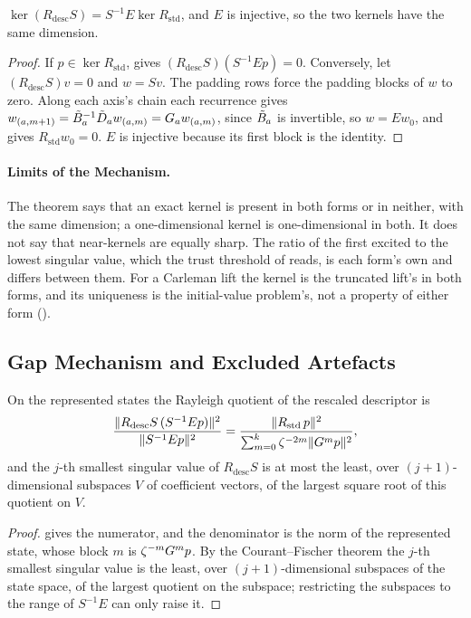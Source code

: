 \begin{theorem}
\label{thm:kernel-equivalence-general}
$\ker(R_{\mathrm{desc}}S)=S^{-1}E\ker R_{\mathrm{std}}$, and $E$ is injective, so the two kernels have the same dimension.
\end{theorem}
\begin{proof}
If $p\in\ker R_{\mathrm{std}}$,  gives $(R_{\mathrm{desc}}S)(S^{-1}Ep)=0$. Conversely, let $(R_{\mathrm{desc}}S)v=0$ and $w=Sv$. The padding rows force the padding blocks of $w$ to zero. Along each axis's chain each recurrence gives $w_{(a,m+1)}=\tilde{B}_a^{-1}\tilde{D}_aw_{(a,m)}=G_aw_{(a,m)}$, since $\tilde{B}_a$ is invertible, so $w=Ew_0$, and  gives $R_{\mathrm{std}}w_0=0$. $E$ is injective because its first block is the identity.
\end{proof}

\paragraph{Limits of the Mechanism.} The theorem says that an exact kernel is present in both forms or in neither, with the same dimension; a one-dimensional kernel is one-dimensional in both. It does not say that near-kernels are equally sharp. The ratio of the first excited to the lowest singular value, which the trust threshold of  reads, is each form's own and differs between them. For a Carleman lift the kernel is the truncated lift's in both forms, and its uniqueness is the initial-value problem's, not a property of either form ().

\subsection{Gap Mechanism and Excluded Artefacts}
\label{app:descriptor-gap}

\begin{proposition}
\label{prop:descriptor-quotient}
On the represented states the Rayleigh quotient of the rescaled descriptor is
\begin{equation}
    \frac{\|R_{\mathrm{desc}}S\,(S^{-1}Ep)\|^2}{\|S^{-1}Ep\|^2}
    =\frac{\|R_{\mathrm{std}}\,p\|^2}{\sum_{m=0}^{k}\zeta^{-2m}\|G^mp\|^2},
\end{equation}
and the $j$-th smallest singular value of $R_{\mathrm{desc}}S$ is at most the least, over $(j+1)$-dimensional subspaces $V$ of coefficient vectors, of the largest square root of this quotient on $V$.
\end{proposition}
\begin{proof}
 gives the numerator, and the denominator is the norm of the represented state, whose block $m$ is $\zeta^{-m}G^mp$. By the Courant--Fischer theorem the $j$-th smallest singular value is the least, over $(j+1)$-dimensional subspaces of the state space, of the largest quotient on the subspace; restricting the subspaces to the range of $S^{-1}E$ can only raise it.
\end{proof}

